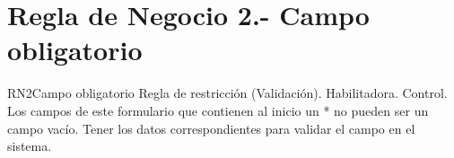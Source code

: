 \section{Regla de Negocio 2.- Campo obligatorio}

\begin{BussinesRule}{RN2}{Campo obligatorio}
	\BRitem[Tipo:] Regla de restricción (Validación).
	\BRitem[Clase:] Habilitadora. 
	\BRitem[Nivel:] Control. %
	\BRitem[Descripción:] Los campos de este formulario que contienen al inicio un * no pueden ser un campo vacío.
	\BRitem[Motivación:] Tener los datos correspondientes para validar el campo en el sistema. 
\end{BussinesRule}
